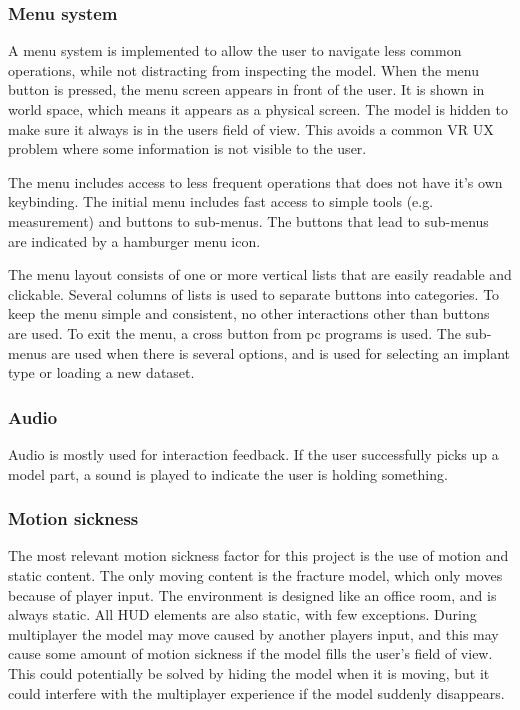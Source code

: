\documentclass[a4paper]{report}
\begin{document}
\subsubsection{Menu system}
A menu system is implemented to allow the user to navigate less common operations, while not distracting from inspecting the model.
When the menu button is pressed, the menu screen appears in front of the user. It is shown in world space, which means it appears as a physical screen. The model is hidden to make sure it always is in the users field of view. This avoids a common VR UX problem where some information is not visible to the user.

The menu includes access to less frequent operations that does not have it's own keybinding. The initial menu includes fast access to simple tools (e.g. measurement) and buttons to sub-menus. The buttons that lead to sub-menus are indicated by a hamburger menu icon.

The menu layout consists of one or more vertical lists that are easily readable and clickable. Several columns of lists is used to separate buttons into categories. To keep the menu simple and consistent, no other interactions other than buttons are used. To exit the menu, a cross button from pc programs is used.
The sub-menus are used when there is several options, and is used for selecting an implant type or loading a new dataset.

\subsubsection{Audio}
Audio is mostly used for interaction feedback. If the user successfully picks up a model part, a sound is played to indicate the user is holding something.

\subsubsection{Motion sickness}
The most relevant motion sickness factor for this project is the use of motion and static content. The only moving content is the fracture model, which only moves because of player input. The environment is designed like an office room, and is always static. All HUD elements are also static, with few exceptions.
During multiplayer the model may move caused by another players input, and this may cause some amount of motion sickness if the model fills the user's field of view. This could potentially be solved by hiding the model when it is moving, but it could interfere with the multiplayer experience if the model suddenly disappears.
\end{document}
